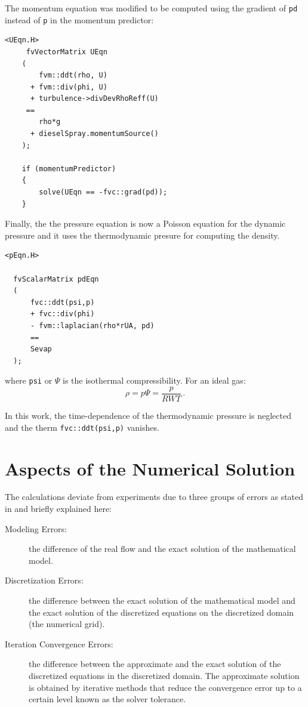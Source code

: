The momentum equation was modified to be computed using the gradient of \verb|pd| instead of \verb|p| in the momentum predictor:
\begin{verbatim}
<UEqn.H>
     fvVectorMatrix UEqn
    (
        fvm::ddt(rho, U)
      + fvm::div(phi, U)
      + turbulence->divDevRhoReff(U)
     ==
        rho*g
      + dieselSpray.momentumSource()
    );

    if (momentumPredictor)
    {
        solve(UEqn == -fvc::grad(pd));
    }
\end{verbatim} 

Finally, the the pressure equation is now a Poisson equation for the dynamic pressure and it uses the thermodynamic presure for computing the density.
\begin{verbatim}
<pEqn.H>

  fvScalarMatrix pdEqn
  (
      fvc::ddt(psi,p)
      + fvc::div(phi)
      - fvm::laplacian(rho*rUA, pd)
      ==
      Sevap
  );
\end{verbatim} 
where \verb|psi| or $\Psi$ is the isothermal compressibility. For an ideal gas:
\begin{equation}
 \rho=p\Psi=\frac{p}{RWT} \, .
\end{equation}

In this work, the time-dependence of the thermodynamic pressure is neglected and the therm \verb|fvc::ddt(psi,p)| vanishes.

\section{Aspects of the Numerical Solution}
The calculations deviate from experiments due to three groups of errors as stated in \cite{jasak} and briefly explained here:
 
\begin{description}
 \item[Modeling Errors:] the difference of the real flow and the exact solution of the mathematical model.
 \item[Discretization Errors:] the difference between the exact solution of the mathematical model and the exact solution of the discretized equations on the discretized domain (the numerical grid).
 \item[Iteration Convergence Errors:] the difference between the approximate and the exact solution of the discretized equations in the discretized domain. The approximate solution is obtained by iterative methods that reduce the convergence error up to a certain level known as the solver tolerance. 
 \end{description}
 
